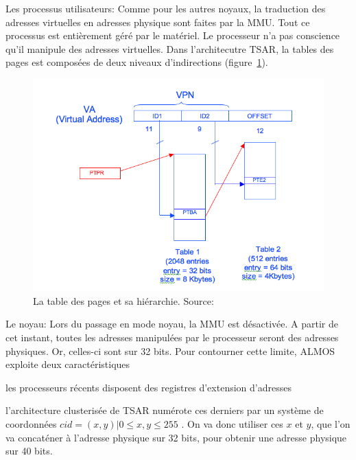       \begin{paragraph}{Les processus utilisateurs:}
        Comme pour les autres noyaux, la traduction des adresses virtuelles en
        adresses physique sont faites par la MMU. Tout ce processus est
        entièrement géré par le matériel. Le processeur n'a pas conscience qu'il
        manipule des adresses virtuelles. Dans l'architecutre TSAR, la tables
        des pages est composées de deux niveaux d'indirections
        (figure~\ref{fig:page-table}).
        
        \begin{figure}
          \centering
          \includegraphics[scale=0.35]{include/img/pages_table_levels.png}
          \caption{La table des pages et sa
            hiérarchie. Source:~\citet{tsar2008web}}
          \label{fig:page-table}
        \end{figure}
        
      \end{paragraph}
      \begin{paragraph}{Le noyau:}
        Lors du passage en mode noyau, la MMU est désactivée. A partir de cet
        instant, toutes les adresses manipulées par le processeur seront des
        adresses physiques. Or, celles-ci sont sur 32 bits. Pour contourner
        cette limite, ALMOS exploite deux caractéristiques \benumline \item les
        processeurs récents disposent des registres d'extension d'adresses \item
        l'architecture clusterisée de TSAR numérote ces derniers par un système
        de coordonnées $cid = (x, y) | 0 \leq x,y \leq 255$ \eenumline. On va
        donc utiliser ces $x$ et $y$, que l'on va concaténer à l'adresse
        physique sur 32 bits, pour obtenir une adresse physique sur 40 bits.
      \end{paragraph}

